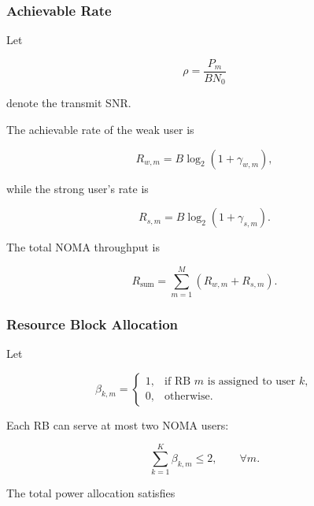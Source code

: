 \documentclass[12pt,a4paper]{article}
\begin{document}
\subsubsection{Achievable Rate}

Let

\begin{equation}
\rho=\frac{P_m}{B N_0}
\end{equation}

denote the transmit SNR.

The achievable rate of the weak user is

\begin{equation}
R_{w,m}
=
B\log_2
\left(
1+\gamma_{w,m}
\right),
\end{equation}

while the strong user's rate is

\begin{equation}
R_{s,m}
=
B\log_2
\left(
1+\gamma_{s,m}
\right).
\end{equation}

The total NOMA throughput is

\begin{equation}
R_{\mathrm{sum}}
=
\sum_{m=1}^{M}
\left(
R_{w,m}+R_{s,m}
\right).
\end{equation}

\subsubsection{Resource Block Allocation}

Let

\begin{equation}
\beta_{k,m}
=
\begin{cases}
1,& \text{if RB }m\text{ is assigned to user }k,\\
0,& \text{otherwise}.
\end{cases}
\end{equation}

Each RB can serve at most two NOMA users:

\begin{equation}
\sum_{k=1}^{K}
\beta_{k,m}
\le 2,
\qquad \forall m.
\end{equation}

The total power allocation satisfies
\end{document}
